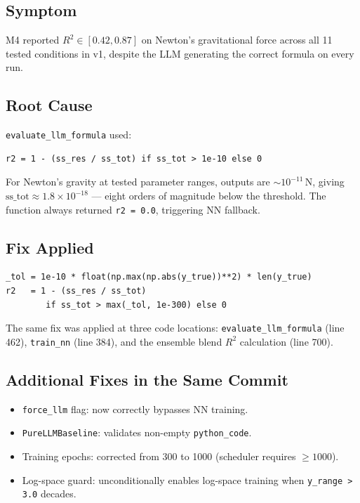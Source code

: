 \documentclass[twoside,11pt]{article}
\newcommand{\Rsq}{R^{2}}
\begin{document}
\subsection{Symptom}

M4 reported $\Rsq \in [0.42, 0.87]$ on Newton's gravitational force across
all 11 tested conditions in v1, despite the LLM generating the correct formula
on every run.

\subsection{Root Cause}

\texttt{evaluate\_llm\_formula} used:
\begin{verbatim}
r2 = 1 - (ss_res / ss_tot) if ss_tot > 1e-10 else 0
\end{verbatim}
For Newton's gravity at tested parameter ranges, outputs are $\sim 10^{-11}$\,N,
giving $\mathrm{ss\_tot} \approx 1.8 \times 10^{-18}$ — eight orders of
magnitude below the threshold.  The function always returned
\texttt{r2 = 0.0}, triggering NN fallback.

\subsection{Fix Applied}

\begin{verbatim}
_tol = 1e-10 * float(np.max(np.abs(y_true))**2) * len(y_true)
r2   = 1 - (ss_res / ss_tot)
        if ss_tot > max(_tol, 1e-300) else 0
\end{verbatim}

The same fix was applied at three code locations:
\texttt{evaluate\_llm\_formula} (line 462),
\texttt{train\_nn} (line 384), and
the ensemble blend $\Rsq$ calculation (line 700).

\subsection{Additional Fixes in the Same Commit}

\begin{itemize}
  \item \texttt{force\_llm} flag: now correctly bypasses NN training.
  \item \texttt{PureLLMBaseline}: validates non-empty \texttt{python\_code}.
  \item Training epochs: corrected from 300 to 1000 (scheduler requires $\geq 1000$).
  \item Log-space guard: unconditionally enables log-space training when
    \texttt{y\_range > 3.0} decades.
\end{itemize}
\end{document}
